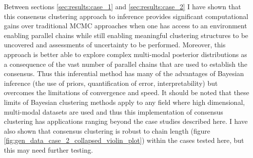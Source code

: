 \documentclass[12pt]{article} %
\begin{document}
	
	Between sections \ref{sec:results:case_1} and \ref{sec:results:case_2} I have shown that this consensus clustering approach to inference provides significant computational gains over traditional MCMC approaches when one has access to an environment enabling parallel chains while still enabling meaningful clustering structures to be uncovered and assessments of uncertainty to be performed. Moreover, this approach is better able to explore complex multi-modal posterior distributions as a consequence of the vast number of parallel chains that are used to establish the consensus. Thus this inferential method has many of the advantages of Bayesian inference (the use of priors, quantification of error, interpretability) but overcomes the limitations of convergence and speed. It should be noted that these limits of Bayesian clustering methods apply to any field where high dimensional, multi-modal datasets are used and thus this implementation of consensus clustering has applications ranging beyond the case studies described here. I have also shown that consensus clustering is robust to chain length (figure \ref{fig:gen_data_case_2_collapsed_violin_plot}) within the cases tested here, but this may need further testing.
	
\end{document}
